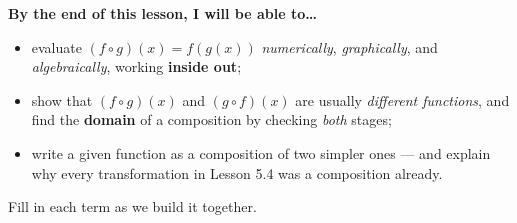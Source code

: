 \documentclass[10pt]{article}
\begin{document}
\namedateperiod

\vspace{0.08in}

\begin{objectivebox}
\textbf{By the end of this lesson, I will be able to\dots}
\begin{itemize}\setlength{\itemsep}{2pt}
  \item evaluate $(f\circ g)(x)=f(g(x))$ \emph{numerically}, \emph{graphically}, and \emph{algebraically}, working \textbf{inside out};
  \item show that $(f\circ g)(x)$ and $(g\circ f)(x)$ are usually \emph{different functions}, and find the \textbf{domain} of a composition by checking \emph{both} stages;
  \item write a given function as a composition of two simpler ones --- and explain why every transformation in Lesson 5.4 was a composition already.
\end{itemize}
\end{objectivebox}

\vspace{0.05in}

\begin{vocabbox}
\small
Fill in each term as we build it together.
\par\vspace{2pt}   %
\end{vocabbox}
\end{document}
